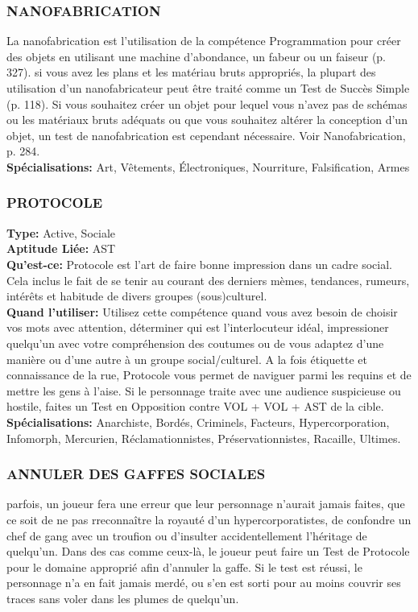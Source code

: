 \subsubsection{NANOFABRICATION} La nanofabrication est l'utilisation de la compétence Programmation pour créer des objets en utilisant une machine d'abondance, un fabeur ou un faiseur (p. 327). si vous avez les plans et les matériau bruts appropriés, la plupart des utilisation d'un nanofabricateur peut être traité comme un Test de Succès Simple (p. 118). Si vous souhaitez créer un objet pour lequel vous n'avez pas de schémas ou les matériaux bruts adéquats ou que vous souhaitez altérer la conception d'un objet, un test de nanofabrication est cependant nécessaire. Voir Nanofabrication, p. 284. \\ \textbf{Spécialisations:} Art, Vêtements, Électroniques, Nourriture, Falsification, Armes 

\subsubsection{PROTOCOLE} \textbf{Type:} Active, Sociale \\ \textbf{Aptitude Liée:} AST \\ \textbf{Qu'est-ce:} Protocole est l'art de faire bonne impression dans un cadre social. Cela inclus le fait de se tenir au courant des derniers mèmes, tendances, rumeurs, intérêts et habitude de divers groupes (sous)culturel. \\ \textbf{Quand l'utiliser:} Utilisez cette compétence quand vous avez besoin de choisir vos mots avec attention, déterminer qui est l'interlocuteur idéal, impressioner quelqu'un avec votre compréhension des coutumes ou de vous adaptez d'une manière ou d'une autre à un groupe social/culturel. A la fois étiquette et connaissance de la rue, Protocole vous permet de naviguer parmi les requins et de mettre les gens à l'aise. Si le personnage traite avec une audience suspicieuse ou hostile, faites un Test en Opposition contre VOL + VOL + AST de la cible. \\ \textbf{Spécialisations:} Anarchiste, Bordés, Criminels, Facteurs, Hypercorporation, Infomorph, Mercurien, Réclamationnistes, Préservationnistes, Racaille, Ultimes. 

\subsubsection{ANNULER DES GAFFES SOCIALES} parfois, un joueur fera une erreur que leur personnage n'aurait jamais faites, que ce soit de ne pas rreconnaître la royauté d'un hypercorporatistes, de confondre un chef de gang avec un troufion ou d'insulter accidentellement l'héritage de quelqu'un. Dans des cas comme ceux-là, le joueur peut faire un Test de Protocole pour le domaine approprié afin d'annuler la gaffe. Si le test est réussi, le personnage n'a en fait jamais merdé, ou s'en est sorti pour au moins couvrir ses traces sans voler dans les plumes de quelqu'un. 




